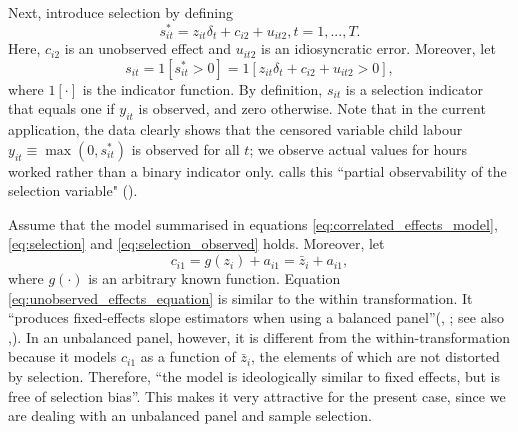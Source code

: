 \documentclass[a4paper,12pt]{article}
\theoremstyle{plain}
\theoremstyle{definition}
\theoremstyle{definition}
\theoremstyle{definition}
\theoremstyle{definition}
\begin{document}
Next, \citet{semykina2010} introduce selection by defining
\begin{equation}
    \label{eq:selection}
    s_{it}^*=z_{it} \delta_t + c_{i2}+u_{it2}, t=1,...,T.
\end{equation}
Here, $c_{i2}$ is an unobserved effect and $u_{it2}$ is an idiosyncratic error. Moreover, let
\begin{equation}
    \label{eq:selection_observed}
    s_{it}=1[s_{it}^*>0] = 1[z_{it} \delta_t + c_{i2}+u_{it2}>0],
\end{equation}
where $1[\cdot]$ is the indicator function. By definition, $s_{it}$ is a selection indicator that equals one if $y_{it}$ is observed, and zero otherwise. Note that in the current application, the data clearly shows that the censored variable  child labour $y_{it}\equiv \max(0,s_{it}^*)$ is observed for all $t$; we observe actual values for hours worked rather than a binary indicator only. \citeauthor{wooldridge1995} calls this ``partial observability of the selection variable" (\citeyear[][p. 120]{wooldridge1995}).

Assume that the model summarised in equations \ref{eq:correlated_effects_model}, \ref{eq:selection} and \ref{eq:selection_observed} holds. Moreover, let
\begin{equation}
    \label{eq:unobserved_effects_equation}
    c_{i1}=g(z_i)+a_{i1} = \bar{z}_i+a_{i1},
\end{equation}
where $g(\cdot)$ is an arbitrary known function. Equation \ref{eq:unobserved_effects_equation} is similar to the within transformation. It ``produces fixed-effects slope estimators when using a balanced panel''(\citeauthor{semykina2010}, \citeyear[][p. 377]{semykina2010}; see also \citeauthor{mundlak1978},\citeyear{mundlak1978}). In an unbalanced panel, however, it is different from the within-transformation because it models $c_{i1}$ as a function of $\bar{z}_i$, the elements of which are not distorted by selection. Therefore, ``the model is ideologically similar to fixed effects, but is free of selection bias''\citep[][p. 377]{semykina2010}. This makes it very attractive for the present case, since we are dealing with an unbalanced panel and sample selection.
\end{document}
